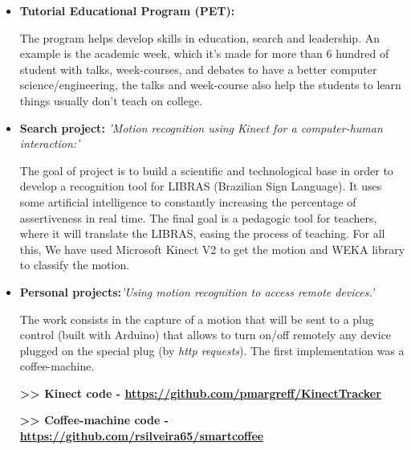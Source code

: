 \documentclass[11pt,a4paper,sans]{moderncv}        %
\begin{document}
\vspace{5pt}

\begin{itemize}

\item{\textbf{Tutorial Educational Program (PET):} \textit{}

\vspace{3pt}

\small{The program helps develop skills in education, search and leadership. An example is the academic week, which it's made for more than 6 hundred of student with talks, week-courses, and debates to have a better computer science/engineering, the talks and week-course also help the students to learn things usually don't teach on college.}}

\item{\textbf{Search project:} \textit{'Motion recognition using Kinect for a computer-human interaction:'}

\vspace{3pt}

\small{The goal of project is to build a scientific and technological base in order to develop a recognition tool for LIBRAS (Brazilian Sign Language). It uses some artificial intelligence to constantly increasing the percentage of assertiveness in real time. The final goal is a pedagogic tool for teachers, where it will translate the LIBRAS,  easing the process of teaching. For all this, We have used Microsoft Kinect V2 to get the motion and WEKA library to classify the motion. }}

\vspace{6pt}

\item{\textbf{Personal projects:}\textit{'Using motion recognition to access remote devices.'}

\vspace{3pt}

\small{The work consists in the capture of a motion that will be sent to a plug control (built with Arduino) that allows to turn on/off remotely any device plugged on the special plug (by \textit{http requests}). The first implementation was a coffee-machine.

\textbf{>> Kinect code - \href{https://github.com/pmargreff/KinectTracker}{https://github.com/pmargreff/KinectTracker}}

\textbf{>> Coffee-machine code - \href{https://github.com/rsilveira65/smartcoffee}{https://github.com/rsilveira65/smartcoffee}}}
}

\end{itemize}
\end{document}
